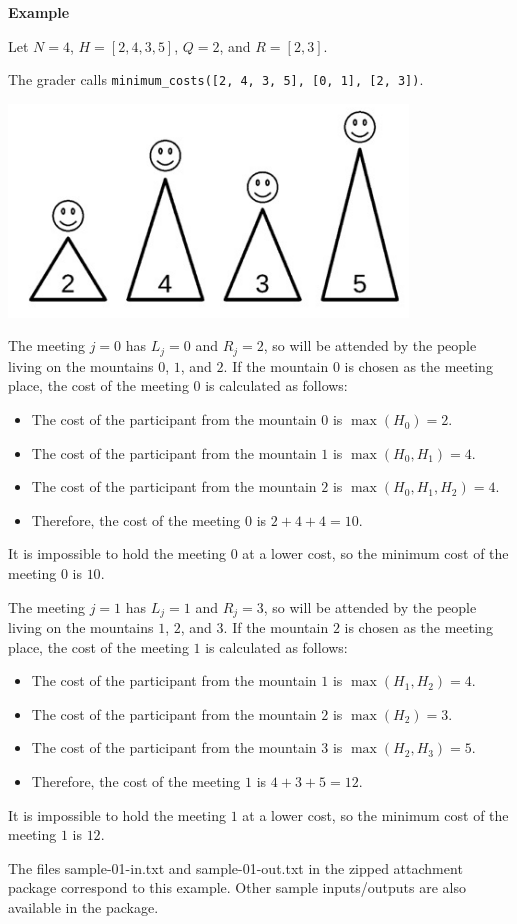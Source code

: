 \textbf{Example}

Let $N=4$, $H=[2,4,3,5]$, $Q=2$, and $R=[2,3]$.

The grader calls \texttt{minimum\_costs([2, 4, 3,
5], [0, 1], [2, 3])}.

\includegraphics{1.png}


The meeting $j=0$ has $L_j=0$ and $R_j=2$, so will be attended by the people living on
the mountains $0$, $1$, and $2$. If the mountain $0$ is chosen as the meeting place, the cost of
the meeting $0$ is calculated as follows:
\begin{itemize}
    \item The cost of the participant from the mountain $0$ is $\max(H_0)=2$.
    \item The cost of the participant from the mountain $1$ is $\max(H_0, H_1)=4$.
    \item The cost of the participant from the mountain $2$ is $\max(H_0, H_1, H_2)=4$.
    \item Therefore, the cost of the meeting $0$ is $2 + 4 + 4 = 10$.

\end{itemize}
It is impossible to hold the meeting $0$ at a lower cost, so the minimum cost of the
meeting $0$ is $10$.

The meeting $j=1$ has $L_j = 1$ and $R_j=3$, so will be attended by the people living on
the mountains $1$, $2$, and $3$. If the mountain $2$ is chosen as the meeting place, the cost of
the meeting $1$ is calculated as follows:

\begin{itemize}
    \item The cost of the participant from the mountain $1$ is $\max(H_1, H_2)=4$.
\item The cost of the participant from the mountain $2$ is $\max(H_2)=3$.
\item The cost of the participant from the mountain $3$ is $\max(H_2, H_3)=5$.
\item Therefore, the cost of the meeting $1$ is $4 + 3 + 5 = 12$.

\end{itemize}


It is impossible to hold the meeting $1$ at a lower cost, so the minimum cost of the
meeting $1$ is $12$.

The files sample-01-in.txt and sample-01-out.txt in the zipped attachment
package correspond to this example. Other sample inputs/outputs are also available in
the package.